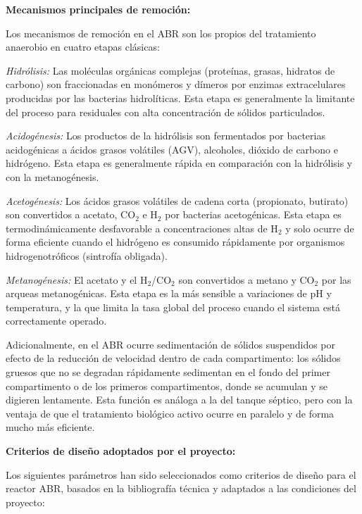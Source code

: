\documentclass[12pt,a4paper]{article}
\begin{document}
\textbf{Mecanismos principales de remoción:}

Los mecanismos de remoción en el ABR son los propios del tratamiento anaerobio en cuatro etapas clásicas:

\textit{Hidrólisis:} Las moléculas orgánicas complejas (proteínas, grasas, hidratos de carbono) son fraccionadas en monómeros y dímeros por enzimas extracelulares producidas por las bacterias hidrolíticas. Esta etapa es generalmente la limitante del proceso para residuales con alta concentración de sólidos particulados.

\textit{Acidogénesis:} Los productos de la hidrólisis son fermentados por bacterias acidogénicas a ácidos grasos volátiles (AGV), alcoholes, dióxido de carbono e hidrógeno. Esta etapa es generalmente rápida en comparación con la hidrólisis y con la metanogénesis.

\textit{Acetogénesis:} Los ácidos grasos volátiles de cadena corta (propionato, butirato) son convertidos a acetato, CO$_2$ e H$_2$ por bacterias acetogénicas. Esta etapa es termodinámicamente desfavorable a concentraciones altas de H$_2$ y solo ocurre de forma eficiente cuando el hidrógeno es consumido rápidamente por organismos hidrogenotróficos (sintrofía obligada).

\textit{Metanogénesis:} El acetato y el H$_2$/CO$_2$ son convertidos a metano y CO$_2$ por las arqueas metanogénicas. Esta etapa es la más sensible a variaciones de pH y temperatura, y la que limita la tasa global del proceso cuando el sistema está correctamente operado.

Adicionalmente, en el ABR ocurre sedimentación de sólidos suspendidos por efecto de la reducción de velocidad dentro de cada compartimento: los sólidos gruesos que no se degradan rápidamente sedimentan en el fondo del primer compartimento o de los primeros compartimentos, donde se acumulan y se digieren lentamente. Esta función es análoga a la del tanque séptico, pero con la ventaja de que el tratamiento biológico activo ocurre en paralelo y de forma mucho más eficiente.

\textbf{Criterios de diseño adoptados por el proyecto:}

Los siguientes parámetros han sido seleccionados como criterios de diseño para el reactor ABR, basados en la bibliografía técnica y adaptados a las condiciones del proyecto:
\end{document}
